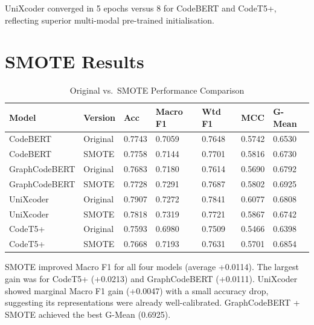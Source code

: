\documentclass[12pt, a4paper]{report}
\begin{document}
UniXcoder converged in 5 epochs versus 8 for CodeBERT and CodeT5+, reflecting superior multi-modal pre-trained initialisation.

\section{SMOTE Results}

\begin{table}[H]
\centering
\caption{Original vs.\ SMOTE Performance Comparison}
\label{tab:smote_comparison}
\begin{tabular}{L{3cm} L{2cm} C{1.5cm} C{1.8cm} C{1.8cm} C{1.5cm} C{1.8cm}}
\toprule
\textbf{Model} & \textbf{Version} & \textbf{Acc} & \textbf{Macro F1} & \textbf{Wtd F1} & \textbf{MCC} & \textbf{G-Mean} \\
\midrule
CodeBERT      & Original & 0.7743 & 0.7059 & 0.7648 & 0.5742 & 0.6530 \\
CodeBERT      & SMOTE    & 0.7758 & 0.7144 & 0.7701 & 0.5816 & 0.6730 \\
GraphCodeBERT & Original & 0.7683 & 0.7180 & 0.7614 & 0.5690 & 0.6792 \\
GraphCodeBERT & SMOTE    & 0.7728 & 0.7291 & 0.7687 & 0.5802 & 0.6925 \\
UniXcoder     & Original & 0.7907 & 0.7272 & 0.7841 & 0.6077 & 0.6808 \\
UniXcoder     & SMOTE    & 0.7818 & 0.7319 & 0.7721 & 0.5867 & 0.6742 \\
CodeT5+       & Original & 0.7593 & 0.6980 & 0.7509 & 0.5466 & 0.6398 \\
CodeT5+       & SMOTE    & 0.7668 & 0.7193 & 0.7631 & 0.5701 & 0.6854 \\
\bottomrule
\end{tabular}
\end{table}

SMOTE improved Macro F1 for all four models (average +0.0114). The largest gain was for CodeT5+ (+0.0213) and GraphCodeBERT (+0.0111). UniXcoder showed marginal Macro F1 gain (+0.0047) with a small accuracy drop, suggesting its representations were already well-calibrated. GraphCodeBERT + SMOTE achieved the best G-Mean (0.6925).
\end{document}

